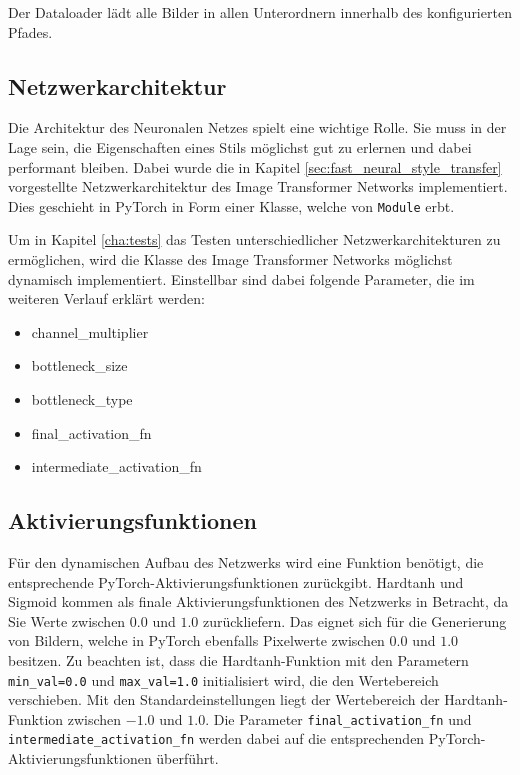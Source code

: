 Der Dataloader lädt alle Bilder in allen Unterordnern innerhalb des konfigurierten Pfades.

\subsection{Netzwerkarchitektur}
\label{sec:network_architecture}

Die Architektur des Neuronalen Netzes spielt eine wichtige Rolle. Sie muss in der Lage sein, die Eigenschaften eines Stils möglichst gut zu erlernen und dabei performant bleiben. Dabei wurde die in Kapitel \ref{sec:fast_neural_style_transfer} vorgestellte Netzwerkarchitektur des Image Transformer Networks implementiert. Dies geschieht in PyTorch in Form einer Klasse, welche von \texttt{Module} erbt.

Um in Kapitel \ref{cha:tests} das Testen unterschiedlicher Netzwerkarchitekturen zu ermöglichen, wird die Klasse des Image Transformer Networks möglichst dynamisch implementiert. Einstellbar sind dabei folgende Parameter, die im weiteren Verlauf erklärt werden:

\begin{itemize}
    \item channel\_multiplier
    \item bottleneck\_size
    \item bottleneck\_type
    \item final\_activation\_fn
    \item intermediate\_activation\_fn
\end{itemize}

\subsection{Aktivierungsfunktionen}

Für den dynamischen Aufbau des Netzwerks wird eine Funktion benötigt, die entsprechende PyTorch-Aktivierungsfunktionen zurückgibt. Hardtanh und Sigmoid kommen als finale Aktivierungsfunktionen des Netzwerks in Betracht, da Sie Werte zwischen $ 0.0 $ und $ 1.0 $ zurückliefern. Das eignet sich für die Generierung von Bildern, welche in PyTorch ebenfalls Pixelwerte zwischen $ 0.0 $ und $ 1.0 $ besitzen. Zu beachten ist, dass die Hardtanh-Funktion mit den Parametern \texttt{min_val=0.0} und \texttt{max_val=1.0} initialisiert wird, die den Wertebereich verschieben. Mit den Standardeinstellungen liegt der Wertebereich der Hardtanh-Funktion zwischen $ -1.0 $ und $ 1.0 $. Die Parameter \texttt{final_activation_fn} und \texttt{intermediate_activation_fn} werden dabei auf die entsprechenden PyTorch-Aktivierungsfunktionen überführt.

